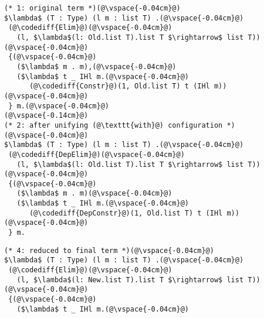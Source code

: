 \begin{figure*}
\begin{minipage}{0.49\textwidth}
\begin{lstlisting}
(* 1: original term *)(@\vspace{-0.04cm}@)
$\lambda$ (T : Type) (l m : list T) .(@\vspace{-0.04cm}@)
 (@\codediff{Elim}@)(@\vspace{-0.04cm}@)
   (l, $\lambda$(l: Old.list T).list T $\rightarrow$ list T))(@\vspace{-0.04cm}@)
 {(@\vspace{-0.04cm}@)
   ($\lambda$ m . m),(@\vspace{-0.04cm}@)
   ($\lambda$ t _ IHl m.(@\vspace{-0.04cm}@)
      (@\codediff{Constr}@)(1, Old.list T) t (IHl m))(@\vspace{-0.04cm}@)
 } m.(@\vspace{-0.04cm}@)
(@\vspace{-0.14cm}@)
(* 2: after unifying (@\texttt{with}@) configuration *)(@\vspace{-0.04cm}@)
$\lambda$ (T : Type) (l m : list T) .(@\vspace{-0.04cm}@)
 (@\codediff{DepElim}@)(@\vspace{-0.04cm}@)
   (l, $\lambda$(l: Old.list T).list T $\rightarrow$ list T))(@\vspace{-0.04cm}@)
 {(@\vspace{-0.04cm}@)
   ($\lambda$ m . m)(@\vspace{-0.04cm}@)
   ($\lambda$ t _ IHl m.(@\vspace{-0.04cm}@)
      (@\codediff{DepConstr}@)(1, Old.list T) t (IHl m))(@\vspace{-0.04cm}@)
 } m.
\end{lstlisting}
\end{minipage}
\hfill
\begin{minipage}{0.49\textwidth}
\begin{lstlisting}
(* 4: reduced to final term *)(@\vspace{-0.04cm}@)
$\lambda$ (T : Type) (l m : list T) .(@\vspace{-0.04cm}@)
 (@\codediff{Elim}@)(@\vspace{-0.04cm}@)
   (l, $\lambda$(l: New.list T).list T $\rightarrow$ list T))(@\vspace{-0.04cm}@)
 {(@\vspace{-0.04cm}@)
   ($\lambda$ t _ IHl m.(@\vspace{-0.04cm}@)

\end{lstlisting}
\end{minipage}
\end{figure*}
